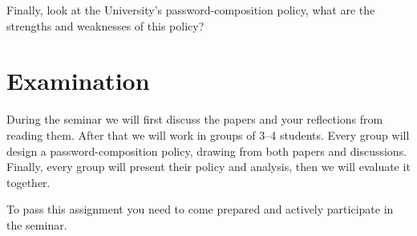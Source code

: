Finally, look at the University's password-composition policy, what are the 
strengths and weaknesses of this policy?


\section{Examination}
\label{sec:exam}

During the seminar we will first discuss the papers and your reflections from 
reading them.
After that we will work in groups of 3--4 students.
Every group will design a password-composition policy, drawing from both papers
and discussions.
Finally, every group will present their policy and analysis, then we will 
evaluate it together.

To pass this assignment you need to come prepared and actively participate in 
the seminar.


\subsubsection*{\ackname}




\printbibliography{}
